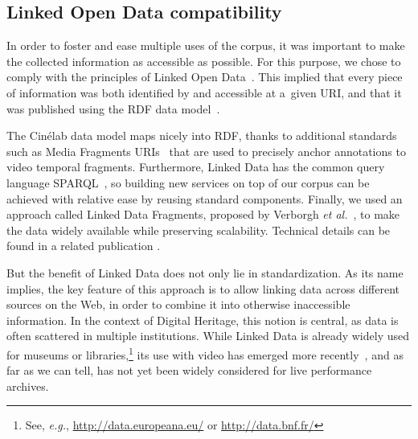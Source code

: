 \documentclass[conference]{IEEEtran}
\begin{document}

\subsection{Linked Open Data compatibility}
In order to foster and ease multiple uses of the corpus,
it was important to make the collected information as accessible as possible.
For this purpose, we chose to comply with the principles of Linked Open Data~\cite{bernerslee2006linkeddata}.
This implied that every piece of information was both identified by and accessible at a~given URI, and that it 
was published using the RDF data model~\cite{cyganiak2014rdf11concepts}.

The Cinélab data model maps nicely into RDF, thanks to additional standards such as Media Fragments URIs~\cite{troncy2012mediafragments} that are used to precisely anchor annotations to video temporal fragments. Furthermore, Linked Data has the common query language SPARQL~\cite{prudhommeaux2008sparql}, so building new services on top of our corpus can be achieved with relative ease by reusing standard components. Finally, we used an approach called Linked Data Fragments, proposed by Verborgh \emph{et al.}~\cite{verborgh2014querying}, to make the data widely
available while preserving scalability. Technical details can be found in a related publication \cite{Steiner15}.

But the benefit of Linked Data does not only lie in standardization. As its name implies, the key feature of this approach is to allow linking data across different sources on the Web, in order to combine it into otherwise inaccessible information. In the context of Digital Heritage, this notion is central, as data is often scattered in multiple institutions. While Linked Data is already widely used for museums or libraries,\footnote{See, \emph{e.g.}, \url{http://data.europeana.eu/} or \url{http://data.bnf.fr/}}
its use with video has emerged more recently~\cite{vandeursen2012mediafragmentannotations,steiner2014webvtt},
and as far as we can tell, has not yet been widely considered for live performance archives. 



\end{document}
